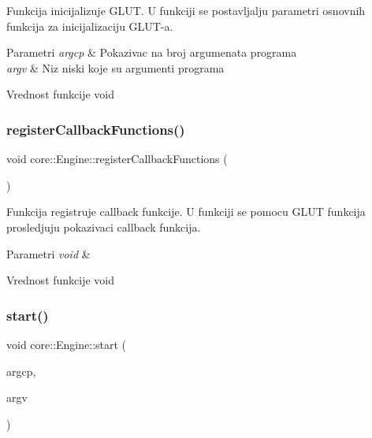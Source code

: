 Funkcija inicijalizuje G\+L\+UT. U funkciji se postavljalju parametri osnovnih funkcija za inicijalizaciju G\+L\+U\+T-\/a. 


\begin{DoxyParams}{Parametri}
{\em argcp} & Pokazivac na broj argumenata programa \\
\hline
{\em argv} & Niz niski koje su argumenti programa \\
\hline
\end{DoxyParams}
\begin{DoxyReturn}{Vrednost funkcije}
void 
\end{DoxyReturn}
\mbox{\label{classcore_1_1Engine_a4a8c96ce1172195507d2233479837ad2}} 
\subsubsection{\texorpdfstring{register\+Callback\+Functions()}{registerCallbackFunctions()}}
{\footnotesize\ttfamily void core\+::\+Engine\+::register\+Callback\+Functions (\begin{DoxyParamCaption}\item[{void}]{ }\end{DoxyParamCaption})\hspace{0.3cm}{\ttfamily [private]}}



Funkcija registruje callback funkcije. U funkciji se pomocu G\+L\+UT funkcija prosledjuju pokazivaci callback funkcija. 


\begin{DoxyParams}{Parametri}
{\em void} & \\
\hline
\end{DoxyParams}
\begin{DoxyReturn}{Vrednost funkcije}
void 
\end{DoxyReturn}
\mbox{\label{classcore_1_1Engine_ac0cb11890396ccdf5100bc73045c4d38}} 
\subsubsection{\texorpdfstring{start()}{start()}}
{\footnotesize\ttfamily void core\+::\+Engine\+::start (\begin{DoxyParamCaption}\item[{int $\ast$}]{argcp,  }\item[{char $\ast$$\ast$}]{argv }\end{DoxyParamCaption})}



